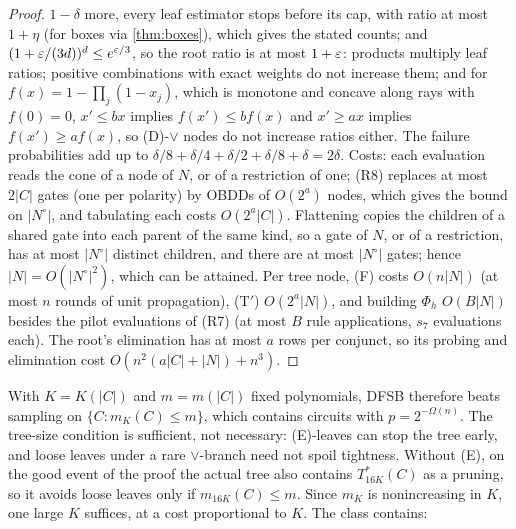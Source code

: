 \begin{proof}
$1-\delta$ more, every leaf estimator stops before its cap, with ratio at most
$1+\eta$ (for boxes via \cref{thm:boxes}), which gives the stated counts; and
$(1+\varepsilon/(3d))^d\le e^{\varepsilon/3}$, so the root ratio is at most $1+\varepsilon$: products
multiply leaf ratios; positive combinations with exact weights do not increase them;
and for $f(x)=1-\prod_j(1-x_j)$, which is monotone and concave along rays with
$f(0)=0$, $x'\le bx$ implies $f(x')\le bf(x)$ and $x'\ge ax$ implies $f(x')\ge
af(x)$, so (D)-$\vee$ nodes do not increase ratios either. The failure
probabilities add up to $\delta/8+\delta/4+\delta/2+\delta/8+\delta=2\delta$.
Costs: each evaluation reads the cone of a node of $N$, or of a restriction of one;
(R8) replaces at most $2|C|$ gates (one per polarity) by OBDDs of $O(2^a)$ nodes,
which gives the bound on $|N^\circ|$, and tabulating each costs $O(2^a|C|)$.
Flattening copies the children of a shared gate into each parent of the same kind,
so a gate of $N$, or of a restriction, has at most $|N^\circ|$ distinct children, and
there are at most $|N^\circ|$ gates; hence $|N|=O(|N^\circ|^2)$, which can be
attained. Per tree node, (F) costs $O(n|N|)$ (at most $n$ rounds of unit
propagation), (T$'$) $O(2^a|N|)$, and building $\Phi_h$ $O(B|N|)$ besides the pilot
evaluations of (R7) (at most $B$ rule applications, $s_7$ evaluations each). The
root's elimination has at most $a$ rows per conjunct, so its probing and elimination
cost $O(n^2(a|C|+|N|)+n^3)$.
\end{proof}

With $K=K(|C|)$ and $m=m(|C|)$ fixed polynomials, DFSB therefore beats sampling
on $\{C:m_K(C)\le m\}$, which contains circuits with $p=2^{-\Omega(n)}$. The
tree-size condition is sufficient, not necessary: (E)-leaves can stop the tree
early, and loose leaves under a rare $\vee$-branch need not spoil tightness.
Without (E), on the good event of the proof the actual tree also contains
$T^*_{16K}(C)$ as a pruning, so it avoids loose leaves only if $m_{16K}(C)\le m$. Since
$m_K$ is nonincreasing in $K$, one large $K$ suffices, at a cost proportional to $K$.
The class contains:

